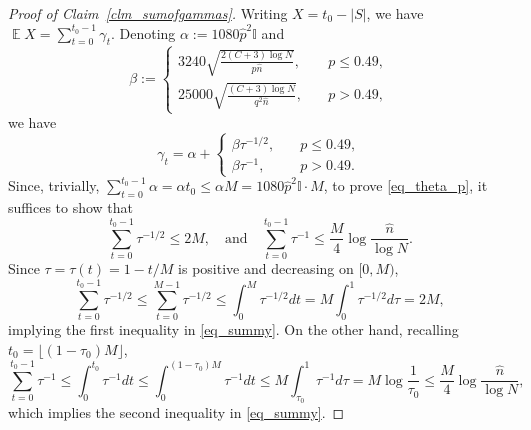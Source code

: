 \documentclass[12pt,reqno]{amsart}
\newcommand{\E}{\operatorname{\mathbb{E}}}
\newcommand{\I} {\mathbb I}
\theoremstyle{definition}
\begin{document}
\begin{proof}[Proof of Claim~\ref{clm_sumofgammas}] Writing $X = t_0 - |S|$, we have $\E X = \sum_{t=0}^{t_0 - 1} \gamma_t$. Denoting $\alpha := 1080\hat p^2 \I$ and
	 \begin{equation*}
		\beta :=
	\begin{cases}
	  3240\sqrt{\frac{2(C + 3)\log N}{p\hat n}}, \quad & p \le 0.49, \\
		25000 \sqrt{\frac{(C + 3)\log N}{q^2\hat n }  }
	, \quad & p > 0.49,
	\end{cases}
	 \end{equation*}
	 we have
	 \begin{equation*}
		 \gamma_t = \alpha +
	\begin{cases}
	  \beta \tau^{-1/2}, \quad & p \le 0.49, \\
		\beta \tau^{-1}, \quad & p > 0.49.
	\end{cases}
	 \end{equation*}
	 Since, trivially, $\sum_{t = 0}^{t_0 - 1} \alpha = \alpha t_0 \le \alpha M = 1080\hat p^2 \I \cdot M$, to prove \eqref{eq_theta_p}, it suffices to show that
	 \begin{equation}
\label{eq_summy}
		 \sum_{t = 0}^{t_0 - 1} \tau^{-1/2} \le 2M, \quad \text{and} \quad
		 \sum_{t = 0}^{t_0 - 1} \tau^{-1} \le \frac{M}{4}\log \frac{\hat n}{\log N}.
	 \end{equation}
	 Since $\tau = \tau(t) = 1 - t/M$ is positive and decreasing on $[0,M)$,
\begin{equation*}
	\sum_{t = 0}^{t_0 - 1} \tau^{-1/2} \le \sum_{t = 0}^{M - 1} \tau^{-1/2} \le \int_0^M \tau^{-1/2} dt = M \int_0^{1} \tau^{-1/2} d\tau = 2M,
\end{equation*}
implying the first inequality in \eqref{eq_summy}. On the other hand, recalling $t_0 = \lfloor (1-\tau_0)M \rfloor$,
\begin{equation*}
  \sum_{t = 0}^{t_0 - 1} \tau^{-1} \le \int_0^{t_0} \tau^{-1} dt \le \int_0^{(1-\tau_0)M} \tau^{-1} dt  \le M \int_{\tau_0}^{1} \tau^{-1} d\tau = M \log \frac{1}{\tau_0} \le \frac{M}{4} \log \frac{\hat n}{\log N},
\end{equation*}
which implies the second inequality in \eqref{eq_summy}.




\end{proof}
\end{document}
